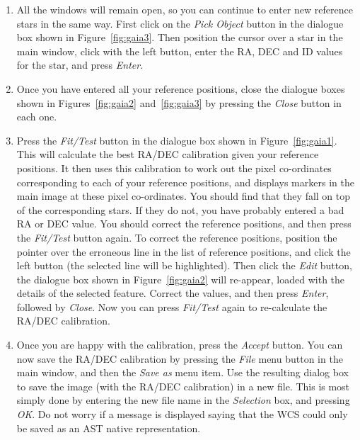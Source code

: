 \documentclass[twoside,11pt]{starlink}
\begin{document}
\begin{enumerate}
\item All the windows will remain open, so you can continue to enter new
reference stars in the same way. First click on the \emph{Pick Object}
button in the dialogue box shown in Figure~\ref{fig:gaia3}. Then position
the cursor over a star in the main window, click with the left button, enter
the RA, DEC and ID values for the star, and press \emph{Enter}.

\item Once you have entered all your reference positions, close the
dialogue boxes shown in Figures~\ref{fig:gaia2} and~\ref{fig:gaia3} by
pressing the \emph{Close} button in each one.

\item Press the \emph{Fit/Test} button in the dialogue box shown in
Figure~\ref{fig:gaia1}. This will calculate the best RA/DEC calibration
given your reference positions. It then uses this calibration to work out
the pixel co-ordinates corresponding to each of your reference positions,
and displays markers in the main image at these pixel co-ordinates. You
should find that they fall on top of the corresponding stars. If they do
not, you have probably entered a bad RA or DEC value. You should correct
the reference positions, and then press the \emph{Fit/Test} button again. To
correct the reference positions, position the pointer over the erroneous
line in the list of reference positions, and click the left button (the
selected line will be highlighted). Then click the \emph{Edit} button, the
dialogue box shown in Figure~\ref{fig:gaia2} will re-appear, loaded with
the details of the selected feature. Correct the values, and then press
\emph{Enter}, followed by \emph{Close}. Now you can press \emph{Fit/Test}
again to re-calculate the RA/DEC calibration.

\item Once you are happy with the calibration, press the \emph{Accept}
button. You can now save the RA/DEC calibration by pressing the \emph{File}
menu button in the main window, and then the \emph{Save as} menu item. Use the
resulting dialog box to save the image (with the RA/DEC calibration) in a
new file. This is most simply done by entering the new file name in the
\emph{Selection} box, and pressing \emph{OK}. Do not worry if a message is
displayed saying that the WCS could only be saved as an AST native
representation.

\end{enumerate}

\clearpage
\end{document}
